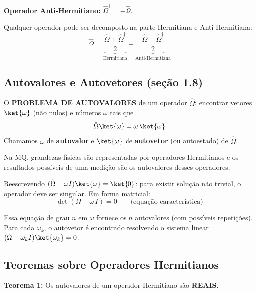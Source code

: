 \begin{observacao}[]{}
    \textbf{Operador Anti-Hermitiano:} $\hat{\Omega}^\dagger = -\hat{\Omega}$.

    Qualquer operador pode ser decomposto na parte Hermitiana e Anti-Hermitiana:
    \[
        \hat{\Omega} = \underbrace{\frac{\hat{\Omega}+\hat{\Omega}^\dagger}{2}}_{\text{Hermitiana}} + \underbrace{\frac{\hat{\Omega}-\hat{\Omega}^\dagger}{2}}_{\text{Anti-Hermitiana}}
    \]
\end{observacao}

\subsection*{Autovalores e Autovetores (seção 1.8)}

\begin{shadequote}
    O \textbf{PROBLEMA DE AUTOVALORES} de um operador $\hat{\Omega}$: encontrar vetores $\ket{\omega}$ (não nulos) e números $\omega$ tais que
    \begin{equation}
        \hat{\Omega}\ket{\omega} = \omega\,\ket{\omega}
    \end{equation}
    Chamamos $\omega$ de \textbf{autovalor} e $\ket{\omega}$ de \textbf{autovetor} (ou autoestado) de $\hat{\Omega}$.
\end{shadequote}

Na MQ, grandezas físicas são representadas por operadores Hermitianos e os resultados possíveis de uma medição são os autovalores desses operadores.

Reescrevendo $(\hat{\Omega} - \omega\hat{I})\ket{\omega} = \ket{0}$: para existir solução não trivial, o operador deve ser singular. Em forma matricial:
\begin{equation}
    \det(\Omega - \omega\, I) = 0 \qquad \text{(equação característica)}
\end{equation}

Essa equação de grau $n$ em $\omega$ fornece os $n$ autovalores (com possíveis repetições). Para cada $\omega_k$, o autovetor é encontrado resolvendo o sistema linear $(\Omega - \omega_k I)\ket{\omega_k} = 0$.

\subsection*{Teoremas sobre Operadores Hermitianos}

\begin{shadequote}
    \textbf{Teorema 1:} Os autovalores de um operador Hermitiano são \textbf{REAIS}.
\end{shadequote}

